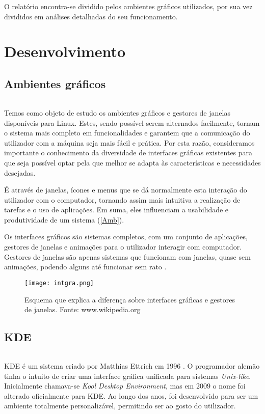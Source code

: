 \documentclass[11pt,openright,twoside]{report}
\begin{document}
O relatório encontra-se dividido pelos ambientes gráficos utilizados, por sua vez divididos em análises detalhadas do seu funcionamento.

\part{Desenvolvimento}

\chapter{Ambientes gráficos}
\paragraph{  }Temos como objeto de estudo os ambientes gráficos e gestores de janelas disponíveis para Linux. Estes, sendo possível serem alternados facilmente, tornam o sistema mais completo em funcionalidades e garantem que a comunicação do utilizador com a máquina seja mais fácil e prática. Por esta razão, consideramos importante o conhecimento da diversidade de interfaces gráficas existentes para que seja possível optar pela que melhor se adapta às características e necessidades desejadas. 

É através de janelas, ícones e menus que se dá normalmente esta interação do utilizador com o computador, tornando assim mais intuitiva a realização de tarefas e o uso de aplicações. Em suma, eles influenciam a usabilidade e produtividade de um sistema (\autoref{Amb}).

Os interfaces gráficos são sistemas completos, com um conjunto de aplicações, gestores de janelas e animações para o utilizador interagir com computador. Gestores de janelas são apenas sistemas que funcionam com janelas, quase sem animações, podendo alguns até funcionar sem rato \cite{Ambientesgraficos}.

\begin{figure}
 \center
 \texttt{[image: intgra.png]}
 \caption{Esquema que explica a diferença sobre interfaces gráficas e gestores de janelas. Fonte: www.wikipedia.org}
 \label{Amb}
\end{figure}

\chapter{KDE}

\paragraph{  }KDE é um sistema criado por Matthias Ettrich em 1996 \cite{KDE}. O programador alemão tinha o intuito de criar uma interface gráfica unificada para sistemas \textit{Unix-like}. Inicialmente chamava-se \textit{Kool Desktop Environment}, mas em 2009 o nome foi alterado oficialmente para KDE. Ao longo dos anos, foi desenvolvido para ser um ambiente totalmente personalizável, permitindo ser ao gosto do utilizador.
\end{document}
